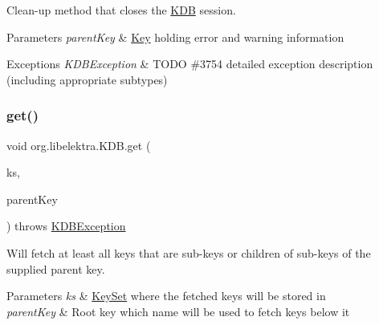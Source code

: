 Clean-\/up method that closes the \hyperlink{classorg_1_1libelektra_1_1KDB}{K\+DB} session. 


\begin{DoxyParams}{Parameters}
{\em parent\+Key} & \hyperlink{classorg_1_1libelektra_1_1Key}{Key} holding error and warning information \\
\hline
\end{DoxyParams}

\begin{DoxyExceptions}{Exceptions}
{\em K\+D\+B\+Exception} & T\+O\+DO \#3754 detailed exception description (including appropriate subtypes) \\
\hline
\end{DoxyExceptions}
\mbox{\label{classorg_1_1libelektra_1_1KDB_ac3b5b3551a9fef5dae1fb468e74272f6}} 
\subsubsection{\texorpdfstring{get()}{get()}\hspace{0.1cm}{\footnotesize\ttfamily [1/2]}}
{\footnotesize\ttfamily void org.\+libelektra.\+K\+D\+B.\+get (\begin{DoxyParamCaption}\item[{final \hyperlink{classorg_1_1libelektra_1_1KeySet}{Key\+Set}}]{ks,  }\item[{final \hyperlink{classorg_1_1libelektra_1_1Key}{Key}}]{parent\+Key }\end{DoxyParamCaption}) throws \hyperlink{classorg_1_1libelektra_1_1exception_1_1KDBException}{K\+D\+B\+Exception}\hspace{0.3cm}{\ttfamily [inline]}}



Will fetch at least all keys that are sub-\/keys or children of sub-\/keys of the supplied parent key. 


\begin{DoxyParams}{Parameters}
{\em ks} & \hyperlink{classorg_1_1libelektra_1_1KeySet}{Key\+Set} where the fetched keys will be stored in \\
\hline
{\em parent\+Key} & Root key which name will be used to fetch keys below it \\
\hline
\end{DoxyParams}

